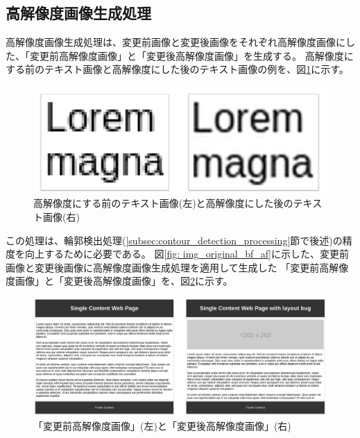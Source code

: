 \subsection{高解像度画像生成処理}\label{subsec:Generate_high_images}
高解像度画像生成処理は、変更前画像と変更後画像をそれぞれ高解像度画像にした、「変更前高解像度画像」と「変更後高解像度画像」を生成する。
高解像度にする前のテキスト画像と高解像度にした後のテキスト画像の例を、図\ref{fig: high_compare}に示す。
\begin{figure}[tp]
    \begin{center}
        \includegraphics[width=1.0\columnwidth]{image/4_high_compare.png}
        \caption{高解像度にする前のテキスト画像(左)と高解像度にした後のテキスト画像(右)}
        \label{fig: high_compare}
    \end{center}
\end{figure}
この処理は、輪郭検出処理(\ref{subsec:contour_detection_processing}節で後述)の精度を向上するために必要である。
図\ref{fig: img_original_bf_af}に示した、変更前画像と変更後画像に高解像度画像生成処理を適用して生成した
「変更前高解像度画像」と「変更後高解像度画像」を、図\ref{fig: high_img}に示す。
\begin{figure}[tp]
    \begin{center}
        \includegraphics[width=1.0\columnwidth]{image/4_img_high_original_bf_af}
        \caption{「変更前高解像度画像」(左)と「変更後高解像度画像」(右)}
        \label{fig: high_img}
    \end{center}
\end{figure}
